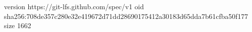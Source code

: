 version https://git-lfs.github.com/spec/v1
oid sha256:708de357c280e32e419672d71dd28690175412a30183d65dda7b61cfba50f177
size 1662
